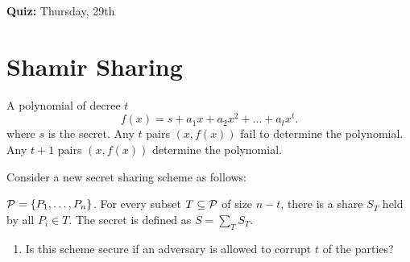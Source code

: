 \textbf{Quiz:} Thursday, 29th

\section{Shamir Sharing} \label{sec:shamir}
A polynomial of decree $t$ \[
    f(x) = s + a_1 x + a_2 x^2 + \dots + a_t x^t.
\] where $s$ is the secret.
Any $t$ pairs $(x, f(x))$ fail to determine the polynomial.
Any $t + 1$ pairs $(x, f(x))$ determine the polynomial.

Consider a new secret sharing scheme as follows:
\begin{problem}
    $\mathcal{P} = \{P_1, \dots, P_n\}$.
    For every subset $T \subseteq \mathcal{P}$ of size $n - t$, there is a share
    $S_T$ held by all $P_i \in T$.
    The secret is defined as $S = \sum_T S_T$.
    \begin{enumerate}
        \item Is this scheme secure if an adversary is allowed to corrupt
        $t$ of the parties?
    \end{enumerate}
\end{problem}
